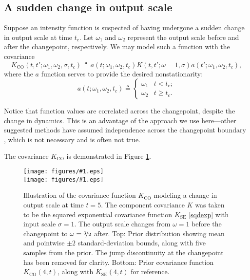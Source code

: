\documentclass{article}
\newcommand{\deq}{\triangleq}
\newcommand{\psff}[1]{\texttt{[image: figures/\#1.eps]}}
\begin{document}
\subsection{A sudden change in output scale}

Suppose an intensity function is suspected of having undergone a
sudden change in output scale at time $t_c$.  Let $\omega_1$ and
$\omega_2$ represent the output scale before and after the changepoint,
respectively.  We may model such a function with the covariance
\begin{equation*}
  K_{\text{CO}}(t, t'; \omega_1, \omega_2, \sigma, t_c)
  \deq 
  a(t; \omega_1, \omega_2, t_c)
  K(t, t'; \omega = 1, \sigma)
  a(t'; \omega_1, \omega_2, t_c),
\end{equation*}
where the $a$ function serves to provide the desired nonstationarity:
\begin{equation}
  \label{outchange}
  a(t; \omega_1, \omega_2, t_c) 
  \deq
  \begin{cases}
    \omega_1 & t < t_c; \\
    \omega_2 & t \geq t_c.
  \end{cases}
\end{equation}

Notice that function values are correlated across the changepoint,
despite the change in dynamics.  This is an advantage of the approach
we use here---other suggested methods have assumed independence
across the changepoint boundary \citep{adamscp, bocpd}, which is not
necessary and is often not true.

The covariance $K_{\text{CO}}$ is demonstrated in Figure
\ref{fig:changeoutput}.

\begin{figure}
  \centering
   \psff{changepointcovsamples3} \\
  \bigskip
  \psff{changepointcov3}\medskip
  \caption{Illustration of the covariance function $K_{\text{CO}}$
    modeling a change in output scale at time $t = \text{5}$.  The
    component covariance $K$ was taken to be the squared exponential
    covariance function $K_{\text{SE}}$ \eqref{sqdexp} with input
    scale $\sigma = {1}$.  The output scale changes from $\omega
    = {1}$ before the changepoint to $\omega = \nicefrac{3}{2}$
    after. Top: Prior distribution showing mean and pointwise $\pm
    {2}$ standard-deviation bounds, along with five samples from
    the prior.  The jump discontinuity at the changepoint has been
    removed for clarity.  Bottom: Prior covariance function
    $K_{\text{CO}}(4, t)$, along with $K_{\text{SE}}(4, t)$ for
    reference.  }
  \label{fig:changeoutput}
\end{figure}
\end{document}
